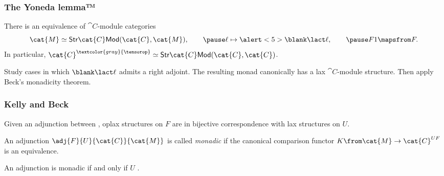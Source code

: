 \documentclass[aspectratio=169,12pt,professionalfont]{beamer}
\begin{document}
\begin{frame}\frametitle{The Yoneda lemma™}
  \begin{proposition*}
    There is an equivalence of \(\cat{C}\)-module categories
    \begin{equation*}
      \cat{M} \simeq \mathsf{Str}\cat{C}\mathsf{Mod}(\cat{C},\cat{M}),\qquad
      \pause
      \ell \mapsto \alert<5>{\blank \lact \ell},\qquad
      \pause
      F1 \mapsfrom F.
    \end{equation*}
    \pause%
    In particular, \(\cat{C}^{\textcolor{gray}{\tensorop}} \simeq \mathsf{Str}\cat{C}\mathsf{Mod}(\cat{C},\cat{C})\).
  \end{proposition*}
  \pause%
\end{frame}

\begin{frame}[standout]
  Study cases in which \(\blank \lact \ell\) admits a right adjoint.
  \pause%
  The resulting monad canonically has a lax \(\cat{C}\)-module structure.
  \pause%
  Then apply Beck's monadicity theorem.
\end{frame}

\begin{frame}\frametitle{Kelly and Beck}
  \begin{theorem}
    Given an adjunction
    between
    ,
    oplax
    structures on \(F\) are in bijective correspondence with
    lax 
    structures on \(U\).
  \end{theorem}
  \pause\pause\pause%
  An adjunction \(\adj{F}{U}{\cat{C}}{\cat{M}}\) is called \emph{monadic} if the canonical comparison functor
  \(K\from \cat{M} \to \cat{C}^{UF}\) is an equivalence.
  \pause%
  \begin{theorem}
    An adjunction is monadic if and only if \(U\)\!
    .
  \end{theorem}
\end{frame}
\end{document}
